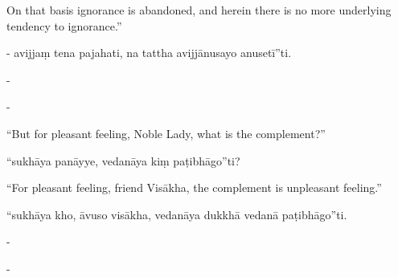 \begin{samepage}
\begin{leftcolumn*}
On that basis ignorance is abandoned, and herein there is no more underlying tendency to ignorance.”
\end{leftcolumn*}

\begin{rightcolumn}
- avijjaṃ tena pajahati, na tattha avijjānusayo anusetī”ti.
\end{rightcolumn}
\end{samepage}

\begin{samepage}
\begin{leftcolumn*}
-
\end{leftcolumn*}

\begin{rightcolumn}
-
\end{rightcolumn}
\end{samepage}

\begin{samepage}
\begin{leftcolumn*}
“But for pleasant feeling, Noble Lady, what is the complement?”
\end{leftcolumn*}

\begin{rightcolumn}
“sukhāya panāyye, vedanāya kiṃ paṭibhāgo”ti?
\end{rightcolumn}
\end{samepage}

\begin{samepage}
\begin{leftcolumn*}
“For pleasant feeling, friend Visākha, the complement is unpleasant feeling.”
\end{leftcolumn*}

\begin{rightcolumn}
“sukhāya kho, āvuso visākha, vedanāya dukkhā vedanā paṭibhāgo”ti.
\end{rightcolumn}
\end{samepage}

\begin{samepage}
\begin{leftcolumn*}
-
\end{leftcolumn*}

\begin{rightcolumn}
-
\end{rightcolumn}
\end{samepage}

